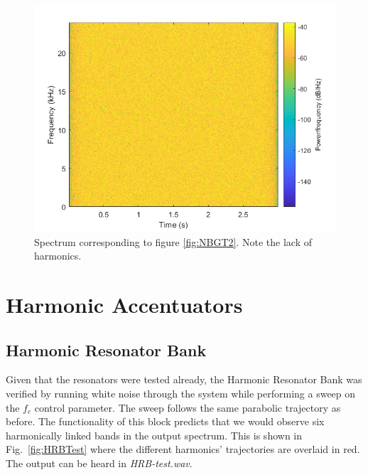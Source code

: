 \documentclass[../main.tex]{subfiles}
\begin{document}
\begin{figure}[h]
    \centering
    \includegraphics[scale=.65]{./images/plots/NBGTest2Spectrum.png}
    \caption{Spectrum corresponding to figure \ref{fig:NBGT2}. Note the lack of harmonics.}
    \label{fig:NBGT2Spec}
\end{figure}

\clearpage

\section{Harmonic Accentuators}
\subsection{Harmonic Resonator Bank}
Given that the resonators were tested already, the Harmonic Resonator Bank was verified by running white noise through the system while performing a sweep on the $f_c$ control parameter. The sweep follows the same parabolic trajectory as before. The functionality of this block predicts that we would observe six harmonically linked bands in the output spectrum. This is shown in Fig.~\ref{fig:HRBTest} where the different harmonics' trajectories are overlaid in red. The output can be heard in \emph{HRB-test.wav}.
\end{document}

